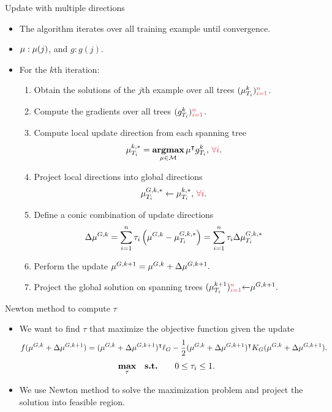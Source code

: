 \documentclass[first=dgreen,second=purple,logo=yellowexc]{aaltoslides}
\begin{document}
\begin{frame}{Update with multiple directions}
	\begin{itemize}\footnotesize
		\item The algorithm iterates over all training example until convergence.
		\item $\mathbf {\mu}:\mathbf {\mu}(j)$, and $g:g(j)$.
		\item For the $k$th iteration:
		\begin{enumerate}\footnotesize
			\item Obtain the solutions of the $j$th example over all trees $(\vmu_{T_i}^k){\color{aaltored}_{i=1}^n}$.
			\item Compute the gradients over all trees $(g_{T_i}^k){\color{aaltored}_{i=1}^n}$.
			\item Compute local update direction from each spanning tree
			\begin{align*}
				{\vmu}_{T_i}^{k,*} = \underset{\vmu\in\Mcal}{\argmax}\,\vmu\tp g_{T_i}^k,\,{\color{aaltored}\forall i}.
			\end{align*}
			\item Project local directions into global directions
			\begin{align*}
				{\vmu}_{T_i}^{G,k,*} \leftarrow {\vmu}_{T_i}^{k,*},\,{\color{aaltored}\forall i}.
			\end{align*}
			\item Define a conic combination of update directions 
			\begin{align*}
				\Delta{\mathbf {\mu}}^{G,k} = \sum_{i=1}^{n}\tau_i \left({\mathbf {\mu}}^{G,k} -{\mathbf {\mu}}_{T_i}^{G,k,*}\right) = \sum_{i=1}^{n}\tau_i \Delta{\mathbf {\mu}}_{T_i}^{G,k,*}
			\end{align*}
			\item Perform the update $\mathbf {\mu}^{G,k+1} = \mathbf {\mu}^{G,k} + \Delta{\mathbf {\mu}}^{G,k+1}.$
			\item Project the global solution on spanning trees $(\vmu_{T_i}^{k+1}){\color{aaltored}_{i=1}^{n}}{\leftarrow}\vmu^{G,k+1}.$
		\end{enumerate}
	\end{itemize}
\end{frame}


\begin{frame}{Newton method to compute $\tau$}
	\begin{itemize}\footnotesize
		\item We want to find $\tau$ that maximize the objective function given the update
		\begin{align*}
			f(\mathbf {\mu}^{G,k} + \Delta{\mathbf {\mu}}^{G,k+1}) = (\mathbf {\mu}^{G,k} + \Delta{\mathbf {\mu}}^{G,k+1})^{\intercal}\ell_G - \frac{1}{2}(\mathbf {\mu}^{G,k} + \Delta{\mathbf {\mu}}^{G,k+1})^{\intercal} K_G (\mathbf {\mu}^{G,k} + \Delta{\mathbf {\mu}}^{G,k+1}).
		\end{align*}
		\begin{align*}
			\underset{\tau}{\textbf{max}} & \quad 
			\textbf{s.t.} & \quad 0\le\tau_i\le1.
		\end{align*}
		\item We use Newton method to solve the maximization problem and project the solution into feasible region.
	\end{itemize}
\end{frame}
\end{document}
